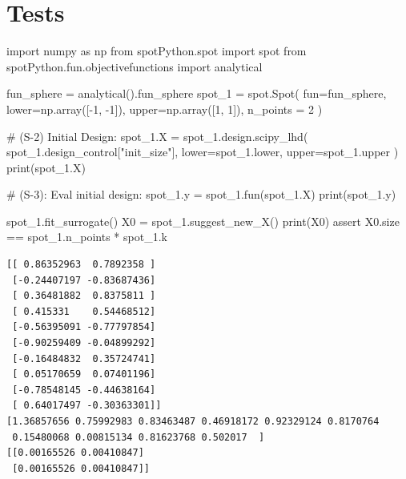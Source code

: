 \documentclass[
  letterpaper,
  DIV=11,
  numbers=noendperiod]{scrreprt}
\newenvironment{Shaded}{\begin{snugshade}}{\end{snugshade}}
\newcommand{\BuiltInTok}[1]{\textcolor[rgb]{0.00,0.23,0.31}{#1}}
\newcommand{\CommentTok}[1]{\textcolor[rgb]{0.37,0.37,0.37}{#1}}
\newcommand{\ControlFlowTok}[1]{\textcolor[rgb]{0.00,0.23,0.31}{#1}}
\newcommand{\DecValTok}[1]{\textcolor[rgb]{0.68,0.00,0.00}{#1}}
\newcommand{\ImportTok}[1]{\textcolor[rgb]{0.00,0.46,0.62}{#1}}
\newcommand{\NormalTok}[1]{\textcolor[rgb]{0.00,0.23,0.31}{#1}}
\newcommand{\OperatorTok}[1]{\textcolor[rgb]{0.37,0.37,0.37}{#1}}
\newcommand{\StringTok}[1]{\textcolor[rgb]{0.13,0.47,0.30}{#1}}
\begin{document}
\hypertarget{tests}{%
\section{Tests}\label{tests}}

\begin{Shaded}
\begin{Highlighting}[]
\ImportTok{import}\NormalTok{ numpy }\ImportTok{as}\NormalTok{ np}
\ImportTok{from}\NormalTok{ spotPython.spot }\ImportTok{import}\NormalTok{ spot}
\ImportTok{from}\NormalTok{ spotPython.fun.objectivefunctions }\ImportTok{import}\NormalTok{ analytical}

\NormalTok{fun\_sphere }\OperatorTok{=}\NormalTok{ analytical().fun\_sphere}
\NormalTok{spot\_1 }\OperatorTok{=}\NormalTok{ spot.Spot(}
\NormalTok{    fun}\OperatorTok{=}\NormalTok{fun\_sphere,}
\NormalTok{    lower}\OperatorTok{=}\NormalTok{np.array([}\OperatorTok{{-}}\DecValTok{1}\NormalTok{, }\OperatorTok{{-}}\DecValTok{1}\NormalTok{]),}
\NormalTok{    upper}\OperatorTok{=}\NormalTok{np.array([}\DecValTok{1}\NormalTok{, }\DecValTok{1}\NormalTok{]),}
\NormalTok{    n\_points }\OperatorTok{=} \DecValTok{2}
\NormalTok{)}

\CommentTok{\# (S{-}2) Initial Design:}
\NormalTok{spot\_1.X }\OperatorTok{=}\NormalTok{ spot\_1.design.scipy\_lhd(}
\NormalTok{    spot\_1.design\_control[}\StringTok{"init\_size"}\NormalTok{], lower}\OperatorTok{=}\NormalTok{spot\_1.lower, upper}\OperatorTok{=}\NormalTok{spot\_1.upper}
\NormalTok{)}
\BuiltInTok{print}\NormalTok{(spot\_1.X)}

\CommentTok{\# (S{-}3): Eval initial design:}
\NormalTok{spot\_1.y }\OperatorTok{=}\NormalTok{ spot\_1.fun(spot\_1.X)}
\BuiltInTok{print}\NormalTok{(spot\_1.y)}

\NormalTok{spot\_1.fit\_surrogate()}
\NormalTok{X0 }\OperatorTok{=}\NormalTok{ spot\_1.suggest\_new\_X()}
\BuiltInTok{print}\NormalTok{(X0)}
\ControlFlowTok{assert}\NormalTok{ X0.size }\OperatorTok{==}\NormalTok{ spot\_1.n\_points }\OperatorTok{*}\NormalTok{ spot\_1.k}
\end{Highlighting}
\end{Shaded}

\begin{verbatim}
[[ 0.86352963  0.7892358 ]
 [-0.24407197 -0.83687436]
 [ 0.36481882  0.8375811 ]
 [ 0.415331    0.54468512]
 [-0.56395091 -0.77797854]
 [-0.90259409 -0.04899292]
 [-0.16484832  0.35724741]
 [ 0.05170659  0.07401196]
 [-0.78548145 -0.44638164]
 [ 0.64017497 -0.30363301]]
[1.36857656 0.75992983 0.83463487 0.46918172 0.92329124 0.8170764
 0.15480068 0.00815134 0.81623768 0.502017  ]
[[0.00165526 0.00410847]
 [0.00165526 0.00410847]]
\end{verbatim}
\end{document}
